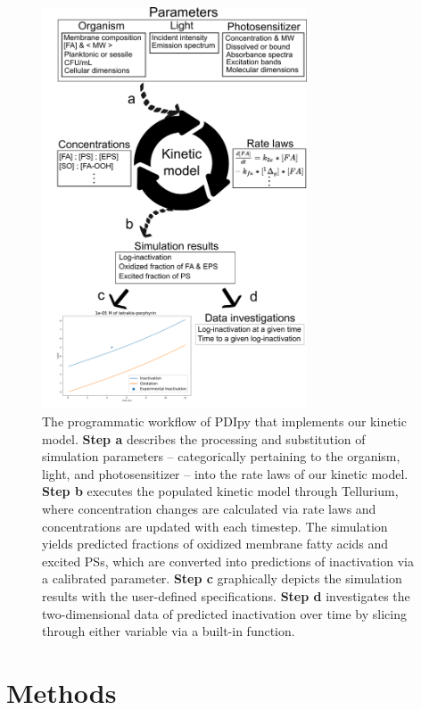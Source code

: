 \begin{figure}
    \centering
    \includegraphics[width = 0.7\textwidth]{images/PDIpy/background/workflow_2.png}
    \caption{
        The programmatic workflow of PDIpy that implements our kinetic model. \textbf{Step a} describes the processing and substitution of simulation parameters -- categorically pertaining to the organism, light, and photosensitizer -- into the rate laws of our kinetic model. \textbf{Step b} executes the populated kinetic model through Tellurium, where concentration changes are calculated via rate laws and concentrations are updated with each timestep. The simulation yields predicted fractions of oxidized membrane fatty acids and excited PSs, which are converted into predictions of inactivation via a calibrated parameter. \textbf{Step c} graphically depicts the simulation results with the user-defined specifications. \textbf{Step d} investigates the two-dimensional data of predicted inactivation over time by slicing through either variable via a built-in function.
    }
    \label{workflow}
\end{figure}

\section{Methods} \label{methods}
